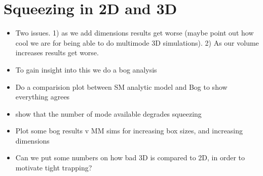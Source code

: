 \documentclass{iopart}
\begin{document}
\section{Squeezing in 2D and 3D}
  \begin{itemize}
  \item Two issues. 1) as we add dimensions results get worse (maybe point out how cool we are for being able to do multimode 3D simulations). 2) As our volume increases results get worse.
  \item To gain insight into this we do a bog analysis
  \item Do a comparision plot between SM analytic model and Bog to show everything agrees
  \item show that the number of mode available degrades squeezing
  \item Plot some bog results v MM sims for increasing box sizes, and increasing dimensions
  \item Can we put some numbers on how bad 3D is compared to 2D, in order to motivate tight trapping?
  \end{itemize}
\end{document}
